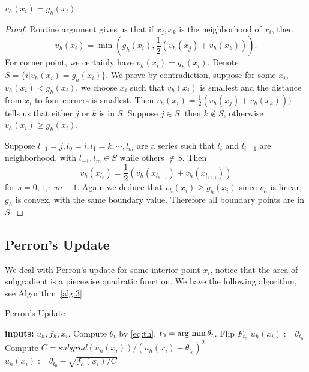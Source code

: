 \documentclass{article}
\begin{document}
\begin{proposition}
	$v_h(x_i) = g_h(x_i).$
\end{proposition}
\begin{proof}
	Routine argument gives us that if $x_j,x_k$ is the neighborhood of $x_i$, then $$v_h(x_i) = \min(g_h(x_i), \frac{1}{2}(v_h(x_j) + v_h(x_k))).$$
	For corner point, we certainly have $v_h(x_i) = g_h(x_i)$.
	Denote $S = \{i| v_h(x_i) = g_h(x_i)\}$.
	We prove by contradiction, suppose for some $x_i$, $v_h(x_i) < g_h(x_i)$, we choose $x_i$ such that $v_h(x_i)$ is smallest and the distance from $x_i$ to four corners is smallest. Then $v_h(x_i) = \frac{1}{2}(v_h(x_j) + v_h(x_k)))$ tells us that either $j$ or $k$ is in $S$. Suppose $j \in S$, then $k \notin S$, otherwise $v_h(x_i) \ge g_h(x_i)$. 
	
	Suppose $l_{-1} = j, l_0 = i, l_1 = k, \cdots, l_m$ are a series such that $l_i$ and $l_{i+1}$ are neighborhood, with $l_{-1}, l_m \in S$ while others $\notin S$. Then $$v_h(x_{l_{s}}) = \frac{1}{2}(v_h(x_{l_{s-1}}) + v_h(x_{l_{s+1}}))$$ for $s = 0,1,\cdots m-1$. Again we deduce that $v_h(x_i) \ge g_h(x_i)$ since $v_h$ is linear, $g_h$ is convex, with the same boundary value. Therefore all boundary points are in $S$.
\end{proof}

\subsection{Perron's Update}
We deal with Perron's update for some interior point $x_i$, notice that the area of subgradient is a piecewise quadratic function. We have the following algorithm, see Algorithm~\ref{alg:3}.
\begin{algorithm}[htbp]
	\caption{Perron's Update}
	\label{alg:3}
	\begin{algorithmic}[1]
		\STATE \textbf{inputs:} $u_h, f_h, x_i$.
		\STATE \Continue
		\ENDIF
		\STATE Compute $\theta_t$ by \eqref{eq:th}.
		\ENDFOR
		\STATE $t_0 = \operatorname{arg~min} \theta_t$.
		\STATE Flip $F_{t_0}$
		\STATE $u_h(x_i):=\theta_{t_0}$
		\STATE \Continue
		\ELSE
		\STATE Compute $C = subgrad(u_h(x_i))/(u_h(x_i) - \theta_{t_0})^2$
		\STATE $u_h(x_i):= \theta_{t_0} - \sqrt{f_h(x_i)/C}$
		\ENDIF
		\ENDWHILE
	\end{algorithmic}
\end{algorithm}
\end{document}
